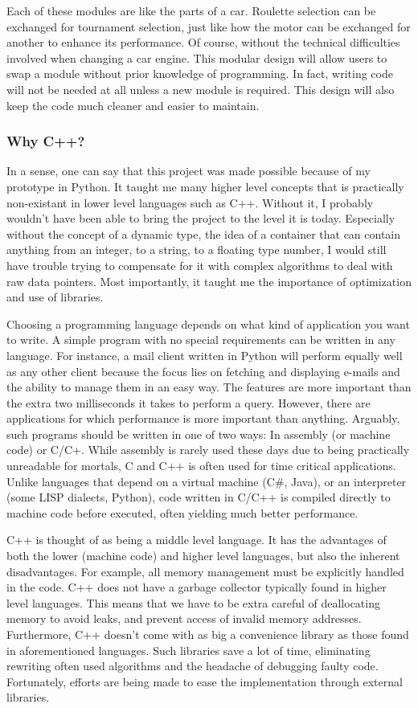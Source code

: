 Each of these modules are like the parts of a car. Roulette selection can be exchanged for tournament selection, just like how the motor can be exchanged for another to enhance its performance. Of course, without the technical difficulties involved when changing a car engine. This modular design will allow users to swap a module without prior knowledge of programming. In fact, writing code will not be needed at all unless a new module is required. This design will also keep the code much cleaner and easier to maintain.

\subsubsection{Why C++?}
In a sense, one can say that this project was made possible because of my prototype in Python. It taught me many higher level concepts that is practically non-existant in lower level languages such as C++. Without it, I probably wouldn't have been able to bring the project to the level it is today. Especially without the concept of a dynamic type, the idea of a container that can contain anything from an integer, to a string, to a floating type number, I would still have trouble trying to compensate for it with complex algorithms to deal with raw data pointers. Most importantly, it taught me the importance of optimization and use of libraries.

Choosing a programming language depends on what kind of application you want to write. A simple program with no special requirements can be written in any language. For instance, a mail client written in Python will perform equally well as any other client because the focus lies on fetching and displaying e-mails and the ability to manage them in an easy way. The features are more important than the extra two milliseconds it takes to perform a query. However, there are applications for which performance is more important than anything. Arguably, such programs should be written in one of two ways: In assembly (or machine code) or C/C+. While assembly is rarely used these days due to being practically unreadable for mortals, C and C++ is often used for time critical applications. Unlike languages that depend on a virtual machine (C\#, Java), or an interpreter (some LISP dialects, Python), code written in C/C++ is compiled directly to machine code before executed, often yielding much better performance.

C++ is thought of as being a middle level language. It has the advantages of both the lower (machine code) and higher level languages, but also the inherent disadvantages. For example, all memory management must be explicitly handled in the code. C++ does not have a garbage collector typically found in higher level languages. This means that we have to be extra careful of deallocating memory to avoid leaks, and prevent access of invalid memory addresses. Furthermore, C++ doesn't come with as big a convenience library as those found in aforementioned languages. Such libraries save a lot of time, eliminating rewriting often used algorithms and the headache of debugging faulty code. Fortunately, efforts are being made to ease the implementation through external libraries.

